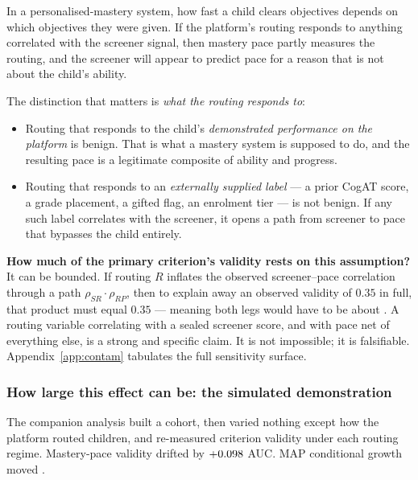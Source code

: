 \documentclass[11pt,a4paper]{article}
\begin{document}
In a personalised-mastery system, how fast a child clears objectives depends on
which objectives they were given. If the platform's routing responds to anything
correlated with the screener signal, then mastery pace partly measures the
routing, and the screener will appear to predict pace for a reason that is not
about the child's ability.

The distinction that matters is \emph{what the routing responds to}:

\begin{itemize}[leftmargin=1.4em,itemsep=0.2em]
\item Routing that responds to the child's \emph{demonstrated performance on the
platform} is benign. That is what a mastery system is supposed to do, and the
resulting pace is a legitimate composite of ability and progress.
\item Routing that responds to an \emph{externally supplied label} --- a prior
CogAT score, a grade placement, a gifted flag, an enrolment tier --- is not
benign. If any such label correlates with the screener, it opens a path from
screener to pace that bypasses the child entirely.
\end{itemize}

\textbf{How much of the primary criterion's validity rests on this
assumption?} It can be bounded. If routing $R$ inflates the observed
screener--pace correlation through a path $\rho_{SR}\cdot\rho_{RP}$, then to
explain away an observed validity of $0.35$ in full, that product must equal
$0.35$ --- meaning both legs would have to be about \ConfoundSymThirtyFive{}. A
routing variable correlating \ConfoundSymThirtyFive{} with a sealed screener
score, and \ConfoundSymThirtyFive{} with pace net of everything else, is a
strong and specific claim. It is not impossible; it is falsifiable.
Appendix~\ref{app:contam} tabulates the full sensitivity surface.

\subsubsection*{How large this effect can be: the simulated demonstration}


The companion analysis built a cohort, then varied nothing except how the
platform routed children, and re-measured criterion validity under each routing
regime. Mastery-pace validity drifted by $+0.098{}$ AUC. MAP
conditional growth moved \RoutingDriftMAP{}.
\end{document}
